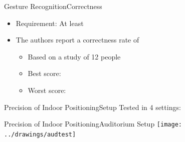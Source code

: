 \begin{frame}{Gesture Recognition}{Correctness}
  \begin{itemize}
    \item Requirement: At least 
    
    \item The authors report a correctness rate of 
    \begin{itemize}
      \item Based on a study of 12 people
      \item Best score: 
      \item Worst score: 
    \end{itemize}
  \end{itemize}
\end{frame}

\begin{frame}{Precision of Indoor Positioning}{Setup}
  Tested in 4 settings:
  
  \begin{center}
  \end{center}
  
  \begin{center}
    \scalebox{0.7}{
      
    }
  \end{center}
  
\end{frame}

\begin{frame}{Precision of Indoor Positioning}{Auditorium Setup}
  \centering\vfill
  \texttt{[image: ../drawings/audtest]}
\end{frame}

